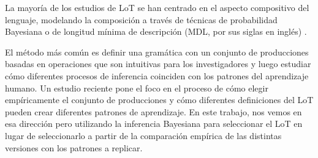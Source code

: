 La mayoría de los estudios de LoT se han centrado en el aspecto compositivo del lenguaje, modelando la composición a través de técnicas de probabilidad Bayesiana \cite{tenenbaum2011grow} o de longitud mínima de descripción (MDL, por sus siglas en inglés) \cite{marie2016,goldsmith2002probabilistic,romano2013language,goldsmith2001unsupervised}.



El método más común es definir una gramática con un conjunto de producciones basadas en operaciones que son intuitivas para los investigadores y luego estudiar cómo diferentes procesos de inferencia coinciden con los patrones del aprendizaje humano. Un estudio reciente \cite{piantadosi2016logical} pone el foco en el proceso de cómo elegir empíricamente el conjunto de producciones y cómo diferentes definiciones del LoT pueden crear diferentes patrones de aprendizaje. En este trabajo, nos vemos en esa dirección pero utilizando la inferencia Bayesiana para seleccionar el LoT en lugar de seleccionarlo a partir de la comparación empírica de las distintas versiones con los patrones a replicar.


